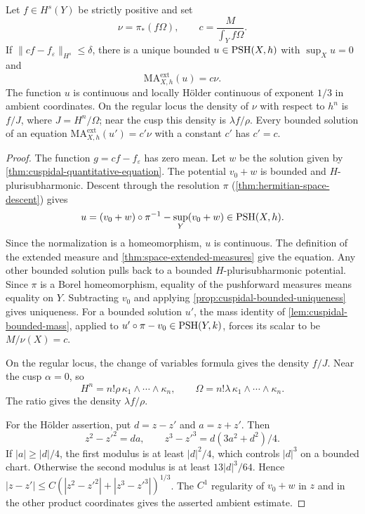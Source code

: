 \begin{theorem}\label{thm:nonclosed-cuspidal-downstairs}
Let $f\in H^s(Y)$ be strictly positive and set
\[
 \nu=\pi_*(f\Omega),\qquad c=\frac{M}{\int_Y f\Omega}.
\]
If $\|cf-f_\varepsilon\|_{H^s}\leq\delta$, there is a unique bounded $u\in\mathrm{PSH}(X,h)$ with $\sup_Xu=0$ and
\[
 \mathrm{MA}^{\mathrm{ext}}_{X,h}(u)=c\nu.
\]
The function $u$ is continuous and locally H\"older continuous of exponent $1/3$ in ambient coordinates. On the regular locus the density of $\nu$ with respect to $h^n$ is $f/J$, where $J=H^n/\Omega$; near the cusp this density is $\lambda f/\rho$. Every bounded solution of an equation $\mathrm{MA}^{\mathrm{ext}}_{X,h}(u')=c'\nu$ with a constant $c'$ has $c'=c$.
\end{theorem}
\begin{proof}
The function $g=cf-f_\varepsilon$ has zero mean. Let $w$ be the solution given by \cref{thm:cuspidal-quantitative-equation}. The potential $v_0+w$ is bounded and $H$-plurisubharmonic. Descent through the resolution $\pi$ (\cref{thm:hermitian-space-descent}) gives
\[
 u=(v_0+w)\circ\pi^{-1}-\sup_Y(v_0+w)\in\mathrm{PSH}(X,h).
\]
Since the normalization is a homeomorphism, $u$ is continuous. The definition of the extended measure and \cref{thm:space-extended-measures} give the equation. Any other bounded solution pulls back to a bounded $H$-plurisubharmonic potential. Since $\pi$ is a Borel homeomorphism, equality of the pushforward measures means equality on $Y$. Subtracting $v_0$ and applying \cref{prop:cuspidal-bounded-uniqueness} gives uniqueness. For a bounded solution $u'$, the mass identity of \cref{lem:cuspidal-bounded-mass}, applied to $u'\circ\pi-v_0\in\mathrm{PSH}(Y,k)$, forces its scalar to be $M/\nu(X)=c$.

On the regular locus, the change of variables formula gives the density $f/J$. Near the cusp $\alpha=0$, so
\[
 H^n=n!\rho\,\kappa_1\wedge\cdots\wedge\kappa_n,
 \qquad \Omega=n!\lambda\,\kappa_1\wedge\cdots\wedge\kappa_n.
\]
The ratio gives the density $\lambda f/\rho$.

For the H\"older assertion, put $d=z-z'$ and $a=z+z'$. Then
\[
 z^2-z'^2=da,\qquad z^3-z'^3=d(3a^2+d^2)/4.
\]
If $|a|\geq|d|/4$, the first modulus is at least $|d|^2/4$, which controls $|d|^3$ on a bounded chart. Otherwise the second modulus is at least $13|d|^3/64$. Hence
$|z-z'|\leq C(|z^2-z'^2|+|z^3-z'^3|)^{1/3}$. The $C^1$ regularity of $v_0+w$ in $z$ and in the other product coordinates gives the asserted ambient estimate.
\end{proof}


